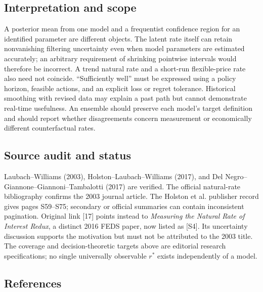\documentclass[11pt,a4paper]{article}
\begin{document}
\subsection*{Interpretation and scope}

A posterior mean from one model and a frequentist confidence region for an identified parameter are different objects. The latent rate itself can retain nonvanishing filtering uncertainty even when model parameters are estimated accurately; an arbitrary requirement of shrinking pointwise intervals would therefore be incorrect. A trend natural rate and a short-run flexible-price rate also need not coincide. ``Sufficiently well'' must be expressed using a policy horizon, feasible actions, and an explicit loss or regret tolerance. Historical smoothing with revised data may explain a past path but cannot demonstrate real-time usefulness. An ensemble should preserve each model's target definition and should report whether disagreements concern measurement or economically different counterfactual rates.

\subsection*{Source audit and status}

Laubach--Williams (2003), Holston--Laubach--Williams (2017), and Del Negro--Giannone--Giannoni--Tambalotti (2017) are verified. The official natural-rate bibliography confirms the 2003 journal article. The Holston et al. publisher record gives pages S59--S75; secondary or official summaries can contain inconsistent pagination. Original link [17] points instead to \emph{Measuring the Natural Rate of Interest Redux}, a distinct 2016 FEDS paper, now listed as [S4]. Its uncertainty discussion supports the motivation but must not be attributed to the 2003 title. The coverage and decision-theoretic targets above are editorial research specifications; no single universally observable $r^*$ exists independently of a model.

\subsection*{References}
\end{document}
